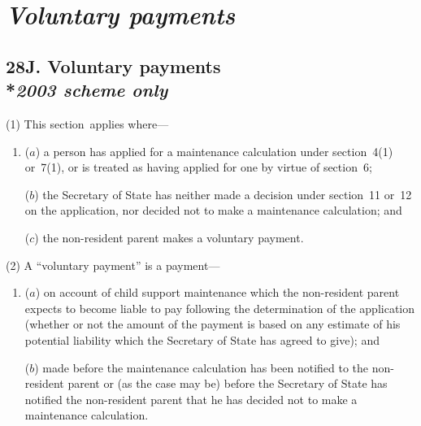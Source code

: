 \documentclass[12pt,a4paper]{article}
\begin{document}


\section{\itshape Voluntary payments}

\subsection[28J. Voluntary payments --- \emph{2003 scheme only}]{28J. Voluntary payments\\*\emph{2003 scheme only}}

(1) This section~applies where—
\begin{enumerate}\item[]
($a$) a person has applied for a maintenance calculation under section~4(1)  or~7(1), or is treated as having applied for one by virtue of section~6;

($b$) the Secretary of State has neither made a decision under section~11 or~12 on the application, nor decided not to make a maintenance calculation; and

($c$) the non-resident parent makes a voluntary payment.
\end{enumerate}

(2) A “voluntary payment” is a payment—
\begin{enumerate}\item[]
($a$) on account of child support maintenance which the non-resident parent expects to become liable to pay following the determination of the application (whether or not the amount of the payment is based on any estimate of his potential liability which the Secretary of State has agreed to give); and

($b$) made before the maintenance calculation has been notified to the non-resident parent or (as the case may be) before the Secretary of State has notified the non-resident parent that he has decided not to make a maintenance calculation.
\end{enumerate}
\end{document}
